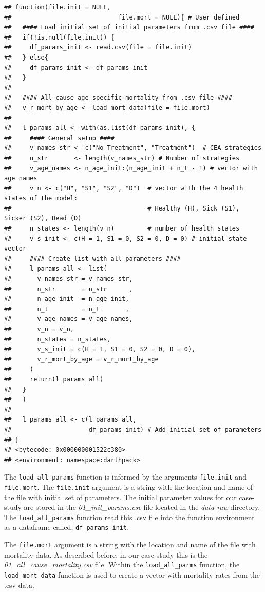 \documentclass[]{book}
\begin{document}
\begin{verbatim}
## function(file.init = NULL,
##                             file.mort = NULL){ # User defined
##   #### Load initial set of initial parameters from .csv file ####
##   if(!is.null(file.init)) {
##     df_params_init <- read.csv(file = file.init)
##   } else{
##     df_params_init <- df_params_init
##   }
##   
##   #### All-cause age-specific mortality from .csv file ####
##   v_r_mort_by_age <- load_mort_data(file = file.mort)
##   
##   l_params_all <- with(as.list(df_params_init), {
##     #### General setup ####
##     v_names_str <- c("No Treatment", "Treatment")  # CEA strategies
##     n_str       <- length(v_names_str) # Number of strategies
##     v_age_names <- n_age_init:(n_age_init + n_t - 1) # vector with age names
##     v_n <- c("H", "S1", "S2", "D")  # vector with the 4 health states of the model:
##                                     # Healthy (H), Sick (S1), Sicker (S2), Dead (D)
##     n_states <- length(v_n)         # number of health states 
##     v_s_init <- c(H = 1, S1 = 0, S2 = 0, D = 0) # initial state vector
##     #### Create list with all parameters ####
##     l_params_all <- list(
##       v_names_str = v_names_str,
##       n_str       = n_str      ,
##       n_age_init  = n_age_init, 
##       n_t         = n_t       , 
##       v_age_names = v_age_names,
##       v_n = v_n,
##       n_states = n_states,
##       v_s_init = c(H = 1, S1 = 0, S2 = 0, D = 0),
##       v_r_mort_by_age = v_r_mort_by_age
##     )
##     return(l_params_all)
##   }
##   )
##   
##   l_params_all <- c(l_params_all, 
##                     df_params_init) # Add initial set of parameters
## }
## <bytecode: 0x000000001522c380>
## <environment: namespace:darthpack>
\end{verbatim}

The \texttt{load\_all\_params} function is informed by the arguments \texttt{file.init} and \texttt{file.mort}. The \texttt{file.init} argument is a string with the location and name of the file with initial set of parameters. The initial parameter values for our case-study are stored in the \emph{01\_init\_params.csv} file located in the \emph{data-raw} directory. The \texttt{load\_all\_params} function read this .csv file into the function environment as a dataframe called, \texttt{df\_params\_init}.

The \texttt{file.mort} argument is a string with the location and name of the file with mortality data. As described before, in our case-study this is the \emph{01\_all\_cause\_mortality.csv} file. Within the \texttt{load\_all\_parms} function, the \texttt{load\_mort\_data} function is used to create a vector with mortality rates from the .csv data.
\end{document}
